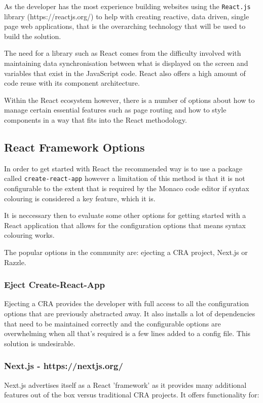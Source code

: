 As the developer has the most experience building websites using the \texttt{React.js} library (https://reactjs.org/) to help with creating reactive, data driven, single page web applications, that is the overarching technology that will be used to build the solution. 

The need for a library such as React comes from the difficulty involved with maintaining data synchronisation between what is displayed on the screen and variables that exist in the JavaScript code. React also offers a high amount of code reuse with its component architecture. 

Within the React ecosystem however, there is a number of options about how to manage certain essential features such as page routing and how to style components in a way that fits into the React methodology.

\subsection{React Framework Options}

In order to get started with React the recommended way is to use a package called \texttt{create-react-app} however a limitation of this method is that it is not configurable to the extent that is required by the Monaco code editor if syntax colouring is considered a key feature, which it is.

It is neccessary then to evaluate some other options for getting started with a React application that allows for the configuration options that means syntax colouring works.

The popular options in the community are: ejecting a CRA project, Next.js or Razzle. 

\subsubsection{Eject Create-React-App}
Ejecting a CRA provides the developer with full access to all the configuration options that are previously abstracted away. It also installs a lot of dependencies that need to be maintained correctly and the configurable options are overwhelming when all that's required is a few lines added to a config file. This solution is undesirable.

\subsubsection{Next.js - https://nextjs.org/}
Next.js advertises itself as a React 'framework' as it provides many additional features out of the box versus traditional CRA projects. It offers functionality for:

